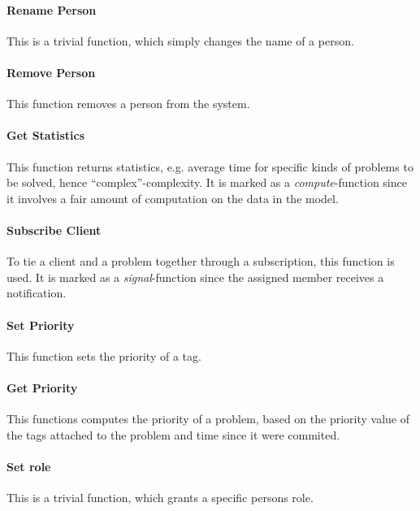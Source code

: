 \paragraph{Rename Person} This is a trivial function, which simply changes the name of a person.

\paragraph{Remove Person} This function removes a person from the system.


\paragraph{Get Statistics} This function returns statistics, e.g. average time for specific kinds of problems to be solved, hence ``complex''-complexity. It is marked as a \textit{compute}-function since it involves a fair amount of computation on the data in the model.

\paragraph{Subscribe Client} To tie a client and a problem together through a subscription, this function is used. It is marked as a \textit{signal}-function since the assigned \astaff[] member receives a notification. 

\paragraph{Set Priority} This function sets the priority of a tag. 

\paragraph{Get Priority} This functions computes the priority of a problem, based on the priority value of the tags attached to the problem and time since it were commited.



\paragraph{Set role} This is a trivial function, which grants a specific persons role.